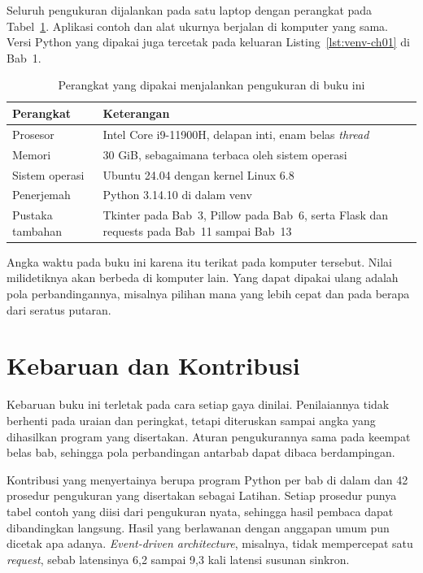 Seluruh pengukuran dijalankan pada satu laptop dengan perangkat pada
Tabel~\ref{tab:lingkungan-ukur}. Aplikasi contoh dan alat ukurnya berjalan di
komputer yang sama. Versi Python yang dipakai juga tercetak pada keluaran
Listing~\ref{lst:venv-ch01} di Bab~1.

\begin{table}[htbp]
  \centering
  \caption{Perangkat yang dipakai menjalankan pengukuran di buku ini}
  \label{tab:lingkungan-ukur}
  \begin{tabularx}{\textwidth}{|l|X|}
    \hline
    \textbf{Perangkat} & \textbf{Keterangan} \\
    \hline
    Prosesor & Intel Core i9-11900H, delapan inti, enam belas \textit{thread} \\
    \hline
    Memori & 30 GiB, sebagaimana terbaca oleh sistem operasi \\
    \hline
    Sistem operasi & Ubuntu 24.04 dengan kernel Linux 6.8 \\
    \hline
    Penerjemah & Python 3.14.10 di dalam venv \\
    \hline
    Pustaka tambahan & Tkinter pada Bab~3, Pillow pada Bab~6, serta Flask dan
      requests pada Bab~11 sampai Bab~13 \\
    \hline
  \end{tabularx}
\end{table}

Angka waktu pada buku ini karena itu terikat pada komputer tersebut. Nilai
milidetiknya akan berbeda di komputer lain. Yang dapat dipakai ulang adalah
pola perbandingannya, misalnya pilihan mana yang lebih cepat dan pada berapa
dari seratus putaran.

\section*{Kebaruan dan Kontribusi}

Kebaruan buku ini terletak pada cara setiap gaya dinilai. Penilaiannya tidak
berhenti pada uraian dan peringkat, tetapi diteruskan sampai angka yang
dihasilkan program yang disertakan. Aturan pengukurannya sama pada keempat belas
bab, sehingga pola perbandingan antarbab dapat dibaca berdampingan.

Kontribusi yang menyertainya berupa program Python per bab di dalam
 dan 42 prosedur pengukuran yang disertakan sebagai Latihan.
Setiap prosedur punya tabel contoh yang diisi dari pengukuran nyata, sehingga
hasil pembaca dapat dibandingkan langsung. Hasil yang berlawanan dengan anggapan
umum pun dicetak apa adanya. \textit{Event-driven architecture}, misalnya, tidak
mempercepat satu \textit{request}, sebab latensinya 6,2 sampai 9,3 kali latensi
susunan sinkron.

